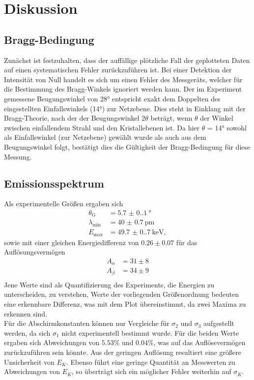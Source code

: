 \section{Diskussion}
\label{sec:Diskussion}

\subsection{Bragg-Bedingung}
Zunächst ist festzuhalten, dass der auffällige plötzliche Fall der geplotteten 
Daten auf einen systematischen Fehler zurückzuführen ist. Bei einer Detektion 
der Intensität von Null handelt es sich um einen Fehler des Messgeräts, welcher 
für die Bestimmung des Bragg-Winkels ignoriert werden kann. Der im Experiment
gemessene Beugungswinkel von 28° entspricht exakt dem Doppelten des eingestellten
Einfallswinkels (14°) zur Netzebene. Dies steht in Einklang mit der Bragg-Theorie,
nach der der Beugungswinkel $2 \theta$ beträgt, wenn $\theta$ der Winkel zwischen
einfallendem Strahl und den Kristallebenen ist. Da hier $\theta$ = 14° sowohl
als Einfallswinkel (zur Netzebene) gewählt wurde als auch aus dem Beugungswinkel 
folgt, bestätigt dies die Gültigkeit der Bragg-Bedingung für diese Messung.

\subsection{Emissionsspektrum}
Als experimentelle Größen ergaben sich
\begin{align*}
    \theta_\text{G}    &= \qty{5.7(0.1)}{\degree}     \\
    \lambda_\text{min} &= \qty{40(0.7)}{\pico\meter}  \\
    E_\text{max}       &= \qty{49.7(0.7)}{\kilo\electronvolt},
\end{align*}
sowie mit einer gleichen Energiedifferenz von $0.26 \pm 0.07$ für das Auflösungsvermögen
\begin{align*}
    A_{\alpha} &= 31 \pm 8 \\
    A_{\beta}  &= 34 \pm 9 \\
\end{align*}
Jene Werte sind als Quantifizierung des Experiments, die Energien zu unterscheiden, 
zu verstehen, Werte der vorliegenden Größenordnung bedeuten eine erkennbare Differenz, 
was mit dem Plot übereinstimmt, da zwei Maxima zu erkennen sind.
\vspace{0.5em}
\\
\noindent Für die Abschirmkonstanten können nur Vergleiche für $\sigma_2$ und 
$\sigma_3$ aufgestellt werden, da sich $\sigma_1$ nicht experimentell bestimmt 
wurde. Für die beiden Werte ergaben sich Abweichungen von $5.53 \%$ und $0.04 \%$,
was auf das Auflösevermögen zurückzuführen sein könnte. Aus der geringen Auflösung 
resultiert eine größere Unsicherheit von $E_K$. Ebenso führt eine geringe 
Quantität an Messwerten zu Abweichungen von $E_K$, so überträgt sich ein möglicher 
Fehler weiterhin auf $\sigma_K$.

